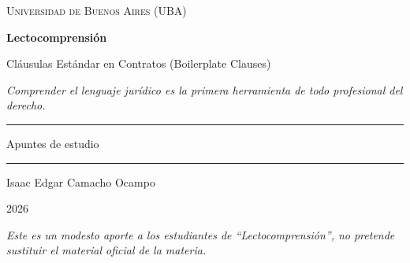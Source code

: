 \documentclass[12pt,oneside]{book}
\newcommand{\universidad}{Universidad de Buenos Aires (UBA)}
\newcommand{\materia}{Lectocomprensión}
\newcommand{\titulo}{Cláusulas Estándar en Contratos (Boilerplate Clauses)}
\newcommand{\autor}{Isaac Edgar Camacho Ocampo}
\newcommand{\anio}{2026}
\begin{document}
\begin{titlepage}
\thispagestyle{empty}

\begin{center}

\vspace*{1cm}

{\large \textsc{\universidad}}

\vspace{3cm}

{\Huge \textbf{\materia}}

\vspace{1cm}

{\LARGE \titulo}

\vspace{0.8cm}

\textit{Comprender el lenguaje jurídico es la primera herramienta de todo profesional del derecho.}

\vspace{1.2cm}

\rule{0.70\textwidth}{0.5pt}

\vspace{0.5cm}

{\large Apuntes de estudio}

\vspace{0.5cm}

\rule{0.70\textwidth}{0.5pt}

\vfill

{\large \autor}

\vspace{0.3cm}

{\large \anio}

\end{center}

\vfill

\begin{flushleft}
\textit{Este es un modesto aporte a los estudiantes de ``Lectocomprensión'', no pretende sustituir el material oficial de la materia.}
\end{flushleft}

\end{titlepage}

\tableofcontents
\clearpage

\end{document}
